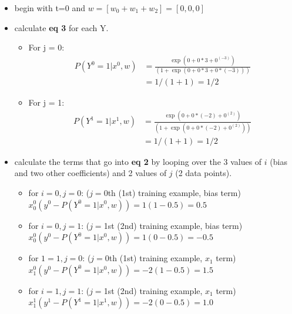 \begin{itemize}
	\item begin with t=0 and $w = [w_0 + w_1 + w_2] = [0, 0, 0]$
	\item calculate \textbf{eq 3} for each Y.  
		\begin{itemize}
			\item For j = 0:  
				\begin{align*}
					P(Y^0 = 1 | x^0, w) &= \frac{\exp(0 + 0*3 + 0^(-3))}{(1 +  \exp(0 + 0*3 + 0*(-3)))} \\
						&= 1/(1+1) = 1/2
				\end{align*}
			\item For j = 1:  
				\begin{align*}
					P(Y^1 = 1 | x^1, w) &= \frac{\exp(0 + 0*(-2) + 0^(2))}{(1 +  \exp(0 +  0*(-2) + 0^(2)))} \\
						&= 1/(1+1) = 1/2
				\end{align*}
		\end{itemize} 
	\item calculate the terms that go into \textbf{eq 2} by looping over the 3 values of $i$ (bias and two other coefficients) and 2 values of $j$ (2 data points).  
		\begin{itemize}
			\item for $i=0, j=0$: ($j=$0th (1st) training example, bias term) \hfill \\
				 $x_0^0(y^0 - P(Y^0=1|x^0, w)) = 1(1-0.5) = 0.5$ 
			\item for $i=0, j=1$: ($j=$1st (2nd) training example, bias term) \hfill \\
				 $x_0^0(y^0 - P(Y^0=1|x^0, w)) = 1(0-0.5) = -0.5$ 
			
			\item for $1=1, j=0$: ($j=$0th (1st) training example, $x_1$ term) \hfill \\
				 $x_1^0(y^0 - P(Y^0=1|x^0, w)) = -2(1-0.5) = 1.5$ 
			\item for $i=1, j=1$: ($j=$1st (2nd) training example, $x_1$ term) \hfill \\
				 $x_1^1(y^1 - P(Y^1=1|x^1, w)) = -2(0-0.5) = 1.0$ 
				 

\end{itemize}
\end{itemize}
